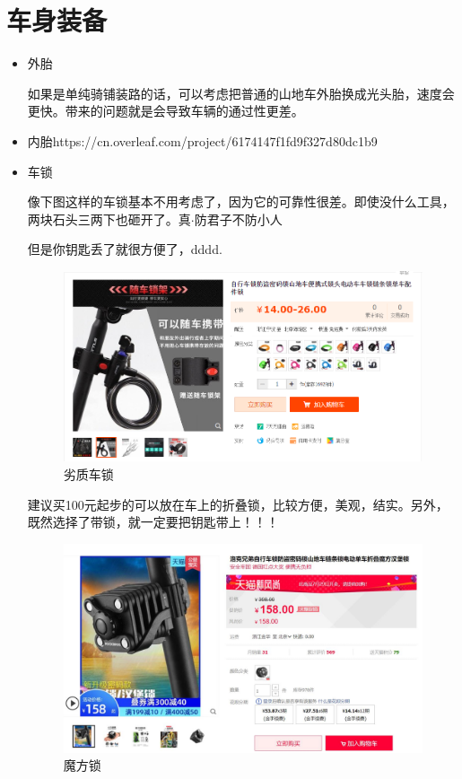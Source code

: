 \documentclass{ctexbook}
\begin{document}
\section{车身装备} 
    \begin{itemize}
        \item 外胎
        
        如果是单纯骑铺装路的话，可以考虑把普通的山地车外胎换成光头胎，速度会更快。带来的问题就是会导致车辆的通过性更差。

        \item 内胎https://cn.overleaf.com/project/6174147f1fd9f327d80dc1b9
        
        \item 车锁
        
        像下图这样的车锁基本不用考虑了，因为它的可靠性很差。即使没什么工具，两块石头三两下也砸开了。真$\cdot$防君子不防小人

        但是你钥匙丢了就很方便了，dddd.

        \begin{figure}[H]
            \caption{劣质车锁}
            \begin{center}
            \includegraphics[scale=0.3]{fig/劣质车锁.png}
            \end{center}
        \end{figure}

        建议买100元起步的可以放在车上的折叠锁，比较方便，美观，结实。另外，既然选择了带锁，就一定要把钥匙带上！！！

        \begin{figure}[H]
            \centering
            \includegraphics[width=0.7\linewidth]{fig/魔方锁}
            \caption{魔方锁}
        \end{figure}
        

\end{itemize}
\end{document}
